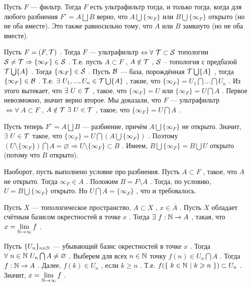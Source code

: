 \SSsect Пусть \( F \) --- фильтр. Тогда \( F \) есть ультрафильтр тогда, и только тогда, когда для любого разбиения \( F^{\circ} = A \bigsqcup B \) верно, что \( A \bigcup \{\infty_F\} \) или \( B \bigcup \{\infty_F\} \) открыто (но не оба вместе). Это также равносильно тому, что \( A \) или \( B \) замкнуто (но не оба вместе).

\SSproof

Пусть \( F = (F,\mathcal{T}) \) . Тогда \( F \) --- ультрафильтр \( \Leftrightarrow \forall~ \mathcal{T} \subset \mathcal{S} \) топологии \( \mathcal{S} \neq \mathcal{T} \Rightarrow \{\infty_F\} \in \mathcal{S} \) . Т.е. пусть \( A \subset F \) , \( A \notin \mathcal{T} \) , \( \mathcal{S} \) -- топология с предбазой \( \mathcal{T} \bigcup \{A\} \) . Тогда \( \{\infty_F\} \in \mathcal{S} \) . Пусть \( \mathcal{B} \) --- база, порождённая \( \mathcal{T} \bigcup \{A\} \) , тогда \( \{\infty_F\} \in \mathcal{B} \) . Т.е. \( \exists~U_1,...,U_n \in \mathcal{T} \bigcup \{A\} \) , такие, что \( \{\infty_F\} = U_1\bigcap ... \bigcap U_n \) . Из этого вытекает, что \( \exists~U \in \mathcal{T} \) , такое, что \( \{\infty_F\} = U \) или \( \{\infty_F\} = U \bigcap A \) . Первое невозможно, значит верно второе. Мы доказали, что \( F \) --- ультрафильтр \( \Leftrightarrow \forall~ A \subset F \) , \( A \notin \mathcal{T} ~\exists~ U \in \mathcal{T} \) , такое, что \( \{\infty_F\} = U \bigcap A \) .

Пусть теперь \( F^{\circ} = A \bigsqcup B \) --- разбиение, причём \( A \bigcup \{\infty_F\} \) не открыто. Значит, \( \exists~ U \in \mathcal{T} \) такое, что \( \{\infty_F\} = U \bigcap (A \bigcup \{\infty_F\}) \) . Поэтому \( (U \setminus \{\infty_F\}) \bigcap A = \varnothing \Rightarrow U \setminus \{\infty_F\} \subset B \) . Имеем, \( B \bigcup \{\infty_F\} = B \bigcup U \) открыто (потому что \( B \) открыто).

Наоборот, пусть выполнено условие про разбиения. Пусть \( A \subset F \) , такое, что \( A \) не открыто. Тогда \( \infty_F \in A \) . Положим \( B = F \setminus A \) . Тогда, по условию, \( U = B \bigcup \{\infty_F\} \) открыто. Но \( U \bigcap A = \{\infty_F\} \) , что и требовалось.

\SSendp

\SSsect Пусть \( X \) --- топологическое пространство, \( A \subset X \) , \( x \in \overline{A} \) . Пусть \( X \) обладает счётным базисом окрестностей в точке \( x \) . Тогда \( \exists~f:\mathbb{N} \rightarrow A \) , такая, что \( x = \lim\limits_{\mathbb{N} \rightarrow \infty} f \) .

\SSproof

Пусть \( \{U_n\}_{n \in \mathbb{N}} \) --- убывающий базис окрестностей в точке \( x \) . Тогда \( \forall~n \in \mathbb{N}~U_n\bigcap A \neq \varnothing \) . Выберем для всех \( n \in \mathbb{N} \) точку \( f(n) \in U_n\bigcap A \) . Тогда \( f:\mathbb{N} \rightarrow A \) . Далее, \( f(k) \in U_n \) , если \( k \geqslant n \) . Т.е. \( f(\{~k \in \mathbb{N}~|~k \geqslant n~\}) \subset U_n \) . Значит, \( x = \lim\limits_{\mathbb{N} \rightarrow \infty} f \) .

